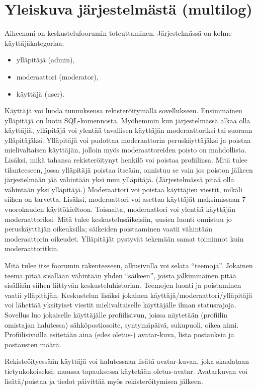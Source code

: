 \documentclass[10pt]{article}
\begin{document}
\section{Yleiskuva järjestelmästä (multilog)}
Aiheenani on keskustelufoorumin toteuttaminen. Järjestelmässä on kolme käyttäjäkategoriaa: 
\begin{itemize}
  \item ylläpitäjä (admin),
  \item moderaattori (moderator),
  \item käyttäjä (user).
\end{itemize}
Käyttäjä voi luoda tunnuksensa rekisteröitymällä sovellukseen. Ensimmäinen ylläpitäjä on luotu SQL-komennosta. Myöhemmin kun järjestelmässä alkaa olla käyttäjiä, ylläpitäjä voi ylentää tavallisen käyttäjän moderaattoriksi tai suoraan ylläpitäjäksi. Ylläpitäjä voi pudottaa moderaattorin peruskäyttäjäksi ja poistaa mielivaltaisen käyttäjän, jolloin myös moderaattoreiden poisto on mahdollista. Lisäksi, mikä tahansa rekisteröitynyt henkilö voi poistaa profiilinsa. Mitä tulee tilanteeseen, jossa ylläpitäjä poistaa itseään, onnistuu se vain jos poiston jälkeen järjestelmään jää vähintään yksi muu ylläpitäjä. (Järjestelmässä pitää olla vähintään yksi ylläpitäjä.) Moderaattori voi poistaa käyttäjien viestit, mikäli siihen on tarvetta. Lisäksi, moderaattori voi asettaa käyttäjät maksimissaan 7 vuorokauden käyttökieltoon. Toisaalta, moderaattori voi ylentää käyttäjän moderaattoriksi. Mitä tulee keskustelusäikeisiin, uusien luonti onnistuu jo peruskäyttäjän oikeuksilla; säikeiden poistaaminen vaatii vähintään moderaattorin oikeudet. Ylläpitäjät pystyvät tekemään samat toiminnot kuin moderaattoritkin. 

Mitä tulee itse foorumin rakenteeseen, alkusivulla voi selata ``teemoja''. Jokainen teema pitää sisällään vähintään yhden ``säikeen'', joista jälkimmäinen pitää sisällään siihen liittyvän keskusteluhistorian. Teemojen luonti ja poistaminen vaatii ylläpitäjän. Keskustelun lisäksi jokainen käyttäjä/moderaattori/ylläpitäjä voi lähettää yksityiset viestit mielivaltaiselle käyttäjälle ilman statusrajoja. Sovellus luo jokaiselle käyttäjälle profiilisivun, joissa näytetään (profiilin omistajan halutessa) sähköpostiosoite, syntymäpäivä, sukupuoli, oikea nimi. Profiilisivuilla esitetään aina (edes oletus-) avatar-kuva, lista postauksia ja postausten määrä.

Rekisteöityessään käyttäjä voi halutessaan lisätä avatar-kuvan, joka skaalataan tietynkokoiseksi; muussa tapauksessa käytetään oletus-avatar. Avatarkuvan voi lisätä/poistaa ja tiedot päivittää myös rekisteröitymisen jälkeen.
\end{document}
